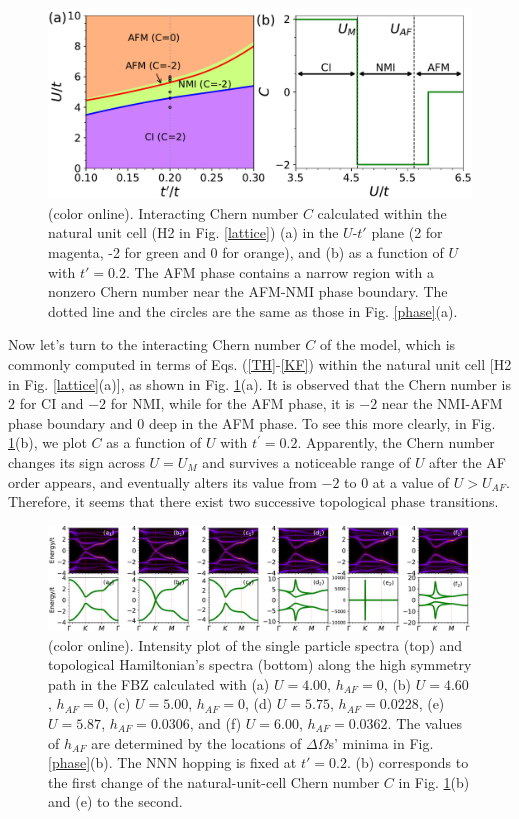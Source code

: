 \documentclass[12pt]{iopart}
\begin{document}
\begin{figure}
\centering
\includegraphics[scale=0.6]{h2chernnumber}
\caption{(color online). Interacting Chern number $C$ calculated within the natural unit cell (H2 in Fig. \ref{lattice}) (a) in the $U$-$t'$ plane (2 for magenta, -2 for green and 0 for orange), and (b) as a function of $U$ with $t'=0.2$. The AFM phase contains a narrow region with a nonzero Chern number near the AFM-NMI phase boundary. The dotted line and the circles are the same as those in Fig. \ref{phase}(a).}\label{h2chernnumber}
\end{figure}

\par Now let's turn to the interacting Chern number $C$ of the model, which is commonly computed in terms of Eqs. (\ref{TH}-\ref{KF}) within the natural unit cell [H2 in Fig. \ref{lattice}(a)], as shown in Fig. \ref{h2chernnumber}(a). It is observed that the Chern number is $2$ for CI and $-2$ for NMI, while for the AFM phase, it is $-2$ near the NMI-AFM phase boundary and $0$ deep in the AFM phase. To see this more clearly, in Fig. \ref{h2chernnumber}(b), we plot $C$ as a function of $U$ with $t^\prime=0.2$. Apparently, the Chern number changes its sign across $U=U_M$ and survives a noticeable range of $U$ after the AF order appears, and eventually alters its value from $-2$ to $0$ at a value of $U>U_{AF}$. Therefore, it seems that there exist two successive topological phase transitions.

\begin{figure}
\centering
\includegraphics[scale=0.45]{h2spectra}
\caption{(color online). Intensity plot of the single particle spectra (top) and topological Hamiltonian's spectra (bottom) along the high symmetry path in the FBZ calculated with (a) $U=4.00$, $h_{AF}=0$, (b) $U=4.60$, $h_{AF}=0$, (c) $U=5.00$, $h_{AF}=0$, (d) $U=5.75$, $h_{AF}=0.0228$, (e) $U=5.87$, $h_{AF}=0.0306$, and (f) $U=6.00$, $h_{AF}=0.0362$. The values of $h_{AF}$ are determined by the locations of $\Delta\Omega$s' minima in Fig. \ref{phase}(b). The NNN hopping is fixed at $t'=0.2$. (b) corresponds to the first change of the natural-unit-cell Chern number $C$ in Fig. \ref{h2chernnumber}(b) and (e) to the second.}\label{h2spectra}
\end{figure}
\end{document}
